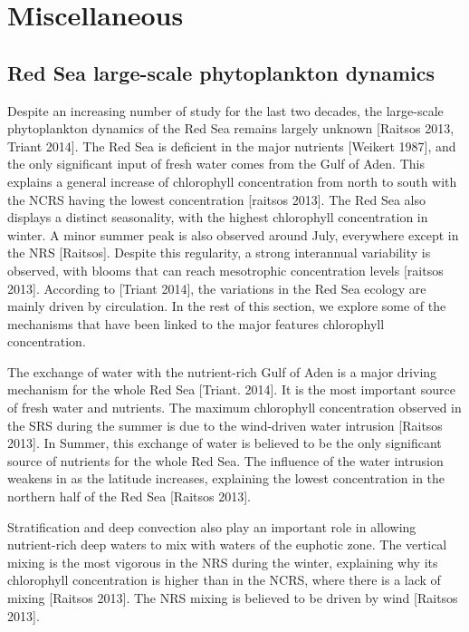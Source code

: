 \chapter{Miscellaneous}
\label{chapter4}

\section{Red Sea large-scale phytoplankton dynamics}

Despite an increasing number of study for the last two decades, the large-scale phytoplankton dynamics of the Red Sea remains largely unknown [Raitsos 2013, Triant 2014]. The Red Sea is deficient in the major nutrients [Weikert 1987], and the only significant input of fresh water comes from the Gulf of Aden. This explains a general increase of chlorophyll concentration from north to south with the NCRS having the lowest concentration [raitsos 2013]. The Red Sea also displays a distinct seasonality, with the highest chlorophyll concentration in winter. A minor summer peak is also observed around July, everywhere except in the NRS [Raitsos]. Despite this regularity, a strong interannual variability is observed, with blooms that can reach mesotrophic concentration levels [raitsos 2013]. According to [Triant 2014], the variations in the Red Sea ecology are mainly driven by circulation. In the rest of this section, we explore some of the mechanisms that have been linked to the major features chlorophyll concentration.

The exchange of water with the nutrient-rich Gulf of Aden is a major driving mechanism for the whole Red Sea [Triant. 2014]. It is the most important source of fresh water and nutrients. The maximum chlorophyll concentration observed in the SRS during the summer is due to the wind-driven water intrusion [Raitsos 2013]. In Summer, this exchange of water is believed to be the only significant source of nutrients for the whole Red Sea. The influence of the water intrusion weakens in as the latitude increases, explaining the lowest concentration in the northern half of the Red Sea [Raitsos 2013].

Stratification and deep convection also play an important role in allowing nutrient-rich deep waters to mix with waters of the euphotic zone. The vertical mixing is the most vigorous in the NRS during the winter, explaining why its chlorophyll concentration is higher than in the NCRS, where there is a lack of mixing [Raitsos 2013]. The NRS mixing is believed to be driven by wind [Raitsos 2013].

